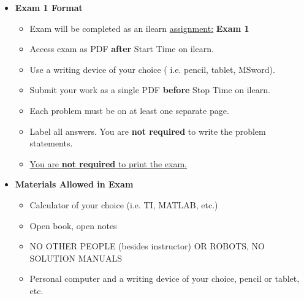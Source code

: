 \documentclass[11pt]{article}
\newcommand{\EXAMNUM}{1\hspace{0mm}}
\begin{document}
\begin{itemize}
             	\item  \textbf{\Large Exam \EXAMNUM \hspace{1mm} Format}
\begin{itemize}
		
			\item Exam will be completed as an ilearn \underline{assignment:} {\bf Exam  \EXAMNUM} 
			
			\item Access exam as PDF {\bf after} Start Time on ilearn.
			\item Use a writing device of your choice ( i.e. pencil, tablet, MSword).
			\item Submit your work as a single PDF {\bf before} Stop Time on ilearn.		 		\item Each problem must be on at least one separate page.
			\item Label all answers. You are {\bf not required} to write the problem statements.
			\item \underline{You are {\bf not required} to print the exam.}
\end{itemize}


		

		\item  \textbf{ Materials Allowed in Exam}

	\begin{itemize}

		\item  Calculator of your choice (i.e. TI, MATLAB, etc.)
	
		\item  Open book, open notes
		
		\item  NO OTHER PEOPLE (besides instructor) OR ROBOTS, NO SOLUTION MANUALS\vspace{1mm}
		
		\item  Personal computer and a writing device of your choice, pencil or tablet, etc.
			

\end{itemize}
\end{itemize}
\end{document}
